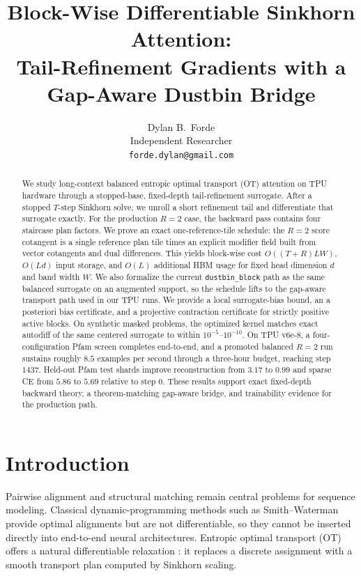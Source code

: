 \documentclass{article}
\title{Block-Wise Differentiable Sinkhorn Attention:\\Tail-Refinement Gradients with a Gap-Aware Dustbin Bridge}
\author{%
  Dylan B.~Forde \\
  Independent Researcher \\
  \texttt{forde.dylan@gmail.com}
}
\begin{document}
\maketitle
\begin{abstract}
We study long-context balanced entropic optimal transport (OT) attention on TPU hardware through a stopped-base, fixed-depth tail-refinement surrogate. After a stopped $T$-step Sinkhorn solve, we unroll a short refinement tail and differentiate that surrogate exactly. For the production $R=2$ case, the backward pass contains four staircase plan factors. We prove an exact one-reference-tile schedule: the $R=2$ score cotangent is a single reference plan tile times an explicit modifier field built from vector cotangents and dual differences. This yields block-wise cost $O((T+R)LW)$, $O(Ld)$ input storage, and $O(L)$ additional HBM usage for fixed head dimension $d$ and band width $W$. We also formalize the current \texttt{dustbin\_block} path as the same balanced surrogate on an augmented support, so the schedule lifts to the gap-aware transport path used in our TPU runs. We provide a local surrogate-bias bound, an a posteriori bias certificate, and a projective contraction certificate for strictly positive active blocks. On synthetic masked problems, the optimized kernel matches exact autodiff of the same centered surrogate to within $10^{-5}$--$10^{-10}$. On TPU v6e-8, a four-configuration Pfam screen completes end-to-end, and a promoted balanced $R=2$ run sustains roughly $8.5$ examples per second through a three-hour budget, reaching step $1437$. Held-out Pfam test shards improve reconstruction from $3.17$ to $0.99$ and sparse CE from $5.86$ to $5.69$ relative to step $0$. These results support exact fixed-depth backward theory, a theorem-matching gap-aware bridge, and trainability evidence for the production path.
\end{abstract}

\section{Introduction}

Pairwise alignment and structural matching remain central problems for sequence modeling. Classical dynamic-programming methods such as Smith--Waterman \citep{smith1981identification} provide optimal alignments but are not differentiable, so they cannot be inserted directly into end-to-end neural architectures. Entropic optimal transport (OT) offers a natural differentiable relaxation \citep{cuturi2013sinkhorn, peyre2019computational}: it replaces a discrete assignment with a smooth transport plan computed by Sinkhorn scaling.
\end{document}
